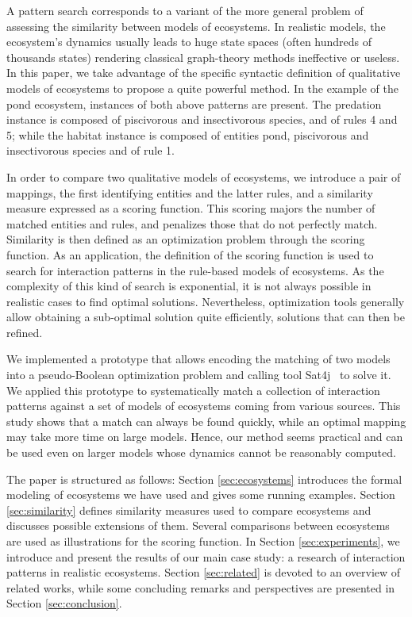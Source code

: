 \documentclass[a4paper,twoside]{article}
\begin{document}
A pattern search corresponds to a variant of the more general problem of assessing the similarity between models of ecosystems. %
In realistic models, the ecosystem's dynamics usually leads to huge state spaces (often hundreds of thousands states) rendering classical graph-theory methods ineffective or useless. %
In this paper, we take advantage of the specific syntactic definition of qualitative models of ecosystems to propose a quite powerful method. %
In the example of the pond ecosystem, instances of both above patterns are present. The predation instance is composed of piscivorous and insectivorous species, and of rules 4 and 5; 
while the habitat instance is composed of entities pond, piscivorous and insectivorous species and of rule 1. %

In order to compare two qualitative models of ecosystems, we introduce a pair of mappings, the first identifying entities and the latter rules, and a similarity measure expressed as a scoring function. %
This scoring majors the number of matched entities and rules, and penalizes those that do not perfectly match. %
Similarity is then defined as an optimization problem through the scoring function. As an application, the definition of the scoring function is used to search for interaction patterns in the rule-based models of ecosystems. 
As the complexity of this kind of search is exponential, it is not always possible in realistic cases to find optimal solutions. %
Nevertheless, optimization tools generally allow obtaining a sub-optimal solution quite efficiently, solutions that can then be refined. %

We implemented a prototype that allows encoding the matching of two models into a pseudo-Boolean optimization problem and calling tool Sat4j~\cite{sat4j} to solve it. %
We applied this prototype to systematically match a collection of interaction patterns against a set of models of ecosystems coming from various sources. %
This study shows that a match can always be found quickly, while an optimal mapping may take more time on large models. %
Hence, our method seems practical and can be used even on larger models whose dynamics cannot be reasonably computed. %

The paper is structured as follows: Section \ref{sec:ecosystems} introduces the formal modeling of ecosystems we have used and gives some running examples. Section \ref{sec:similarity} defines similarity measures used to compare ecosystems and discusses possible extensions of them. 
Several comparisons between ecosystems are used as illustrations for the scoring function.
In Section \ref{sec:experiments}, we introduce and present the results of our main case study: a research of interaction patterns in realistic ecosystems. %
Section \ref{sec:related} is devoted to an overview of related works, while some concluding remarks and perspectives are presented in Section \ref{sec:conclusion}. %
\end{document}

